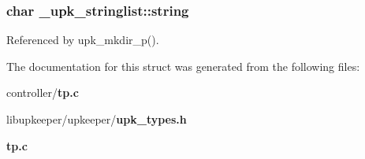 \subsubsection[{string}]{\setlength{\rightskip}{0pt plus 5cm}char {\bf \_\-upk\_\-stringlist::string}}\label{struct__upk__stringlist_a207f190df01a6d52211d69eca3b05d0a}


Referenced by upk\_\-mkdir\_\-p().



The documentation for this struct was generated from the following files:\begin{DoxyCompactItemize}
\item 
controller/{\bf tp.c}\item 
libupkeeper/upkeeper/{\bf upk\_\-types.h}\item 
{\bf tp.c}\end{DoxyCompactItemize}
